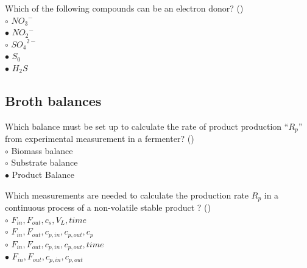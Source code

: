 \documentclass[]{beamer}
\begin{document}
\begin{frame}[shrink] {}
\addtocounter{questions}{1}
\color{blue}
Which of the following compounds can be an electron donor?   ()\\
\color{black}
\setlength{\parindent}{-0.4cm}
{\color{red}$\circ$}  ${NO_{3}}^{-}$\\
{\color{red}$\bullet$} ${NO_{2}}^{-}$\\
{\color{red}$\circ$} ${SO_{4}}^{2-}$\\
{\color{red}$\bullet$} $S_0$\\
{\color{red}$\bullet$} $H_{2}S$ \\
\end{frame}

\subsection{Broth balances}
\setcounter{questions}{0}

\begin{frame}[shrink] {}
\addtocounter{questions}{1}
\color{blue}
Which balance must be set up to calculate the rate of product production “$R_p$” from experimental measurement in a fermenter? ()\\
\color{black}
\setlength{\parindent}{-0.4cm}
{\color{red}$\circ$} Biomass balance\\
{\color{red}$\circ$} Substrate balance\\
{\color{red}$\bullet$} Product Balance \\
\end{frame}

\begin{frame}[shrink] {}
\addtocounter{questions}{1}
\color{blue}
Which measurements are needed to calculate the production rate $R_p$ in a continuous process of a non-volatile stable product ? ()\\
\color{black}
\setlength{\parindent}{-0.4cm}
{\color{red}$\circ$}  $F_{in},F_{out},c_{s},V_{L},time$  \\
{\color{red}$\circ$}  $F_{in},F_{out},c_{p,in},c_{p,out},c_p$ \\
{\color{red}$\circ$}  $F_{in},F_{out},c_{p,in},c_{p,out},time$ \\
{\color{red}$\bullet$}  $F_{in},F_{out},c_{p,in},c_{p,out}$\\
\end{frame}
\end{document}
